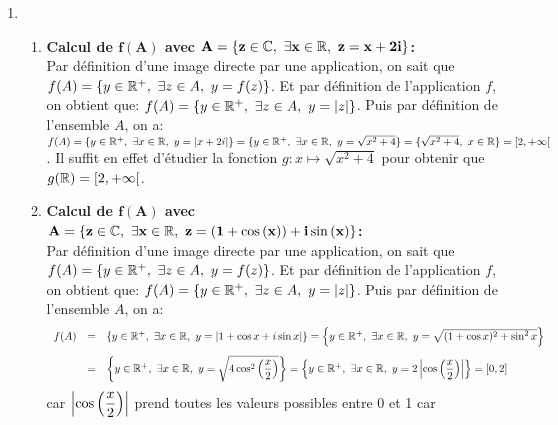 \documentclass[a4paper, 11pt,reqno]{article}
\begin{document}
\begin{correction} \;
	\begin{enumerate}
		\item
		      \begin{enumerate}
			      \item \textbf{Calcul de $\mathbf{f(A)}$ avec $\mathbf{A=\left\lbrace z\in\mathbb{C},\ \exists x\in\mathbb{R},\ z=x+2i\right\rbrace}$:}\\
			            \noindent  Par d\'efinition d'une image directe par une application, on sait que
			            $f(A)=\lbrace y\in\R^+,\ \exists z\in A,\ y=f(z)\rbrace$. Et par d\'efinition de l'application $f$, on obtient que:
			            $f(A)=\lbrace y\in\R^+,\ \exists z\in A,\ y=|z|\rbrace$. Puis par d\'efinition de l'ensemble $A$, on a:
			            $f(A)=\lbrace y\in\R^+,\ \exists x\in \R,\ y=|x+2i| \rbrace=\lbrace y\in\R^+,\ \exists x\in \R,\ y=\sqrt{x^2+4} \rbrace=\lbrace \sqrt{x^2+4},\ x\in\R\rbrace=\lbrack 2,+\infty\lbrack$. Il suffit en effet d'\'etudier la fonction $g: x\mapsto \sqrt{x^2+4}$ pour obtenir que $g(\mathbb{R})=\lbrack 2,+\infty\lbrack$.
			      \item \textbf{Calcul de $\mathbf{f(A)}$ avec $\mathbf{A=\left\lbrace z\in\bC,\ \exists x\in\R,\ z=(1+\cos{(x)})+i\sin{(x)}   \right\rbrace}$:}\\
			            \noindent
			            Par d\'efinition d'une image directe par une application, on sait que
			            $f(A)=\lbrace y\in\R^+,\ \exists z\in A,\ y=f(z)\rbrace$. Et par d\'efinition de l'application $f$, on obtient que:
			            $f(A)=\lbrace y\in\R^+,\ \exists z\in A,\ y=|z|\rbrace$. Puis par d\'efinition de l'ensemble $A$, on a:
			            $$\begin{array}{lll}
					            f(A) & = & \lbrace y\in\R^+,\ \exists x\in \R,\ y=|1+\cos{x}+i\sin{x}| \rbrace=\left\lbrace y\in\R^+,\ \exists x\in \R,\
					            y=\sqrt{(1+\cos{x})^2+\sin^2{x}} \right\rbrace\vsec                                                                      \\
					                 & = & \left\lbrace y\in\R^+,\ \exists x\in \R,\
					            y=\sqrt{4\cos^2{\left( \ddp\frac{x}{2}\right)}} \right\rbrace=\left\lbrace y\in\R^+,\ \exists x\in \R,\
					            y=2\left| \cos{\left( \ddp\frac{x}{2}\right)} \right| \right\rbrace=\lbrack 0,2\rbrack
				            \end{array}$$ car $\left| \cos{\left( \displaystyle\frac{x}{2}\right)} \right| $ prend toutes les valeurs possibles entre 0 et 1 car 

\end{enumerate}
\end{enumerate}
\end{correction}
\end{document}

